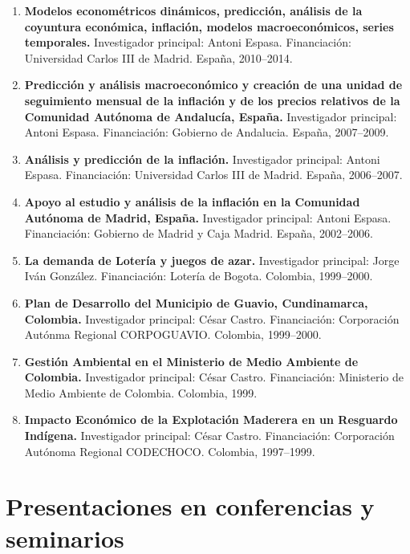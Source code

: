 \documentclass[11pt]{article}\usepackage[]{graphicx}\usepackage[]{color}
\begin{document}
\begin{enumerate}

\item \textbf{Modelos econométricos dinámicos, predicción, análisis de la
coyuntura económica, inflación, modelos macroeconómicos, series temporales.} Investigador principal: Antoni Espasa. Financiación: Universidad Carlos III de Madrid. España, 2010--2014.

\item \textbf{Predicción y análisis macroeconómico y creación de una unidad de seguimiento mensual de la inflación y de los precios relativos de la Comunidad Autónoma de Andalucía, España.} Investigador principal: Antoni Espasa. Financiación: Gobierno de Andalucia. España, 2007--2009.

\item \textbf{Análisis y predicción de la inflación.} Investigador principal: Antoni Espasa. Financiación: Universidad Carlos III de Madrid. España, 2006--2007.

\item \textbf{Apoyo al estudio y análisis de la inflación en la Comunidad 
Autónoma de Madrid, España.} Investigador principal: Antoni Espasa. Financiación: Gobierno de Madrid y Caja Madrid. España, 2002--2006.

\item \textbf{La demanda de Lotería y juegos de azar.} Investigador principal: Jorge Iván González. Financiación: Lotería de Bogota. Colombia, 1999--2000.

\item \textbf{Plan de Desarrollo del Municipio de Guavio, Cundinamarca, Colombia.} Investigador principal: César Castro. Financiación: Corporación Autónma Regional CORPOGUAVIO. Colombia, 1999--2000.

\item \textbf{Gestión Ambiental en el Ministerio de Medio Ambiente de Colombia.} Investigador principal: César Castro. Financiación: Ministerio de Medio Ambiente de Colombia. Colombia, 1999.

\item \textbf{Impacto Económico de la Explotación Maderera en un Resguardo Indígena.} Investigador principal: César Castro. Financiación: Corporación Autónoma Regional CODECHOCO. Colombia, 1997--1999.

\end{enumerate}

\section{Presentaciones en conferencias y seminarios} 
\end{document}
